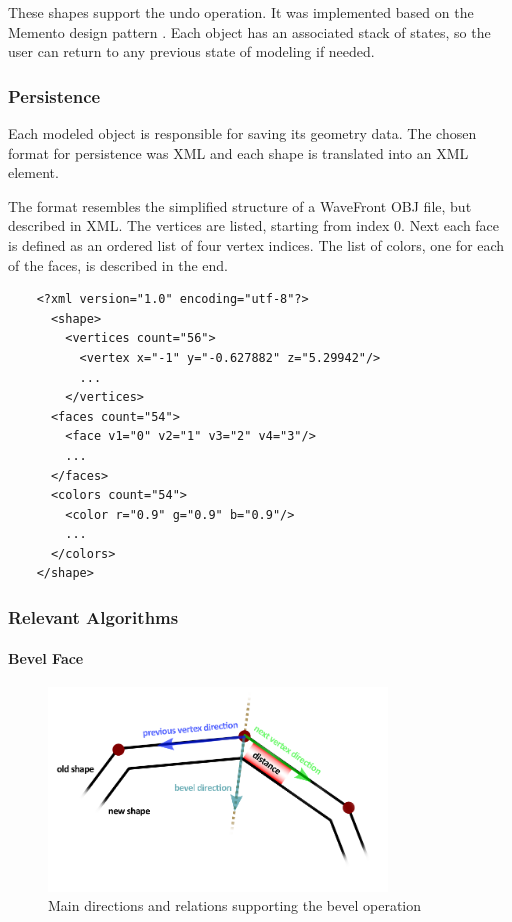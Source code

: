 These shapes support the undo operation. It was implemented based on the Memento design pattern \cite{despat}.
Each object has an associated stack of states, so the user can return to any previous state of modeling if needed.


\subsubsection{Persistence}
\label{sec:shape-persistence}

Each modeled object is responsible for saving its geometry data.
The chosen format for persistence was XML and each shape is translated into an XML element.

The format resembles the simplified structure of a WaveFront OBJ file, but described in XML.
The vertices are listed, starting from index 0.
Next each face is defined as an ordered list of four vertex indices.
The list of colors, one for each of the faces, is described in the end.

\begin{small}
	\begin{verbatim}
	<?xml version="1.0" encoding="utf-8"?>
	  <shape>
	    <vertices count="56">
	      <vertex x="-1" y="-0.627882" z="5.29942"/>
	      ...
	    </vertices>
	  <faces count="54">
	    <face v1="0" v2="1" v3="2" v4="3"/>
	    ...
	  </faces>
	  <colors count="54">
	    <color r="0.9" g="0.9" b="0.9"/>
	    ...
	  </colors>
	</shape>
	\end{verbatim}
\end{small}


\subsubsection{Relevant Algorithms}

\paragraph{Bevel Face}

\begin{figure}[!ht]
    \centering
    \includegraphics[width=9cm]{gfx/bevel.png}
    \vspace{-1cm}
    \caption{Main directions and relations supporting the bevel operation}
    \label{FIG-GS-BEVEL}
\end{figure}


